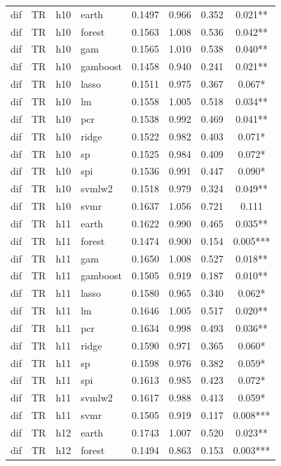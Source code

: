 \begin{ThreePartTable}
\begin{longtable}[t]{llclcccc}
\addlinespace
dif & TR & h10 & earth & 0.1497 & 0.966 & 0.352 & 0.021**\\
dif & TR & h10 & forest & 0.1563 & 1.008 & 0.536 & 0.042**\\
dif & TR & h10 & gam & 0.1565 & 1.010 & 0.538 & 0.040**\\
dif & TR & h10 & gamboost & 0.1458 & 0.940 & 0.241 & 0.021**\\
dif & TR & h10 & lasso & 0.1511 & 0.975 & 0.367 & 0.067*\\
dif & TR & h10 & lm & 0.1558 & 1.005 & 0.518 & 0.034**\\
dif & TR & h10 & pcr & 0.1538 & 0.992 & 0.469 & 0.041**\\
dif & TR & h10 & ridge & 0.1522 & 0.982 & 0.403 & 0.071*\\
dif & TR & h10 & sp & 0.1525 & 0.984 & 0.409 & 0.072*\\
dif & TR & h10 & spi & 0.1536 & 0.991 & 0.447 & 0.090*\\
dif & TR & h10 & svmlw2 & 0.1518 & 0.979 & 0.324 & 0.049**\\
dif & TR & h10 & svmr & 0.1637 & 1.056 & 0.721 & 0.111\\
\addlinespace
dif & TR & h11 & earth & 0.1622 & 0.990 & 0.465 & 0.035**\\
dif & TR & h11 & forest & 0.1474 & 0.900 & 0.154 & 0.005***\\
dif & TR & h11 & gam & 0.1650 & 1.008 & 0.527 & 0.018**\\
dif & TR & h11 & gamboost & 0.1505 & 0.919 & 0.187 & 0.010**\\
dif & TR & h11 & lasso & 0.1580 & 0.965 & 0.340 & 0.062*\\
dif & TR & h11 & lm & 0.1646 & 1.005 & 0.517 & 0.020**\\
dif & TR & h11 & pcr & 0.1634 & 0.998 & 0.493 & 0.036**\\
dif & TR & h11 & ridge & 0.1590 & 0.971 & 0.365 & 0.060*\\
dif & TR & h11 & sp & 0.1598 & 0.976 & 0.382 & 0.059*\\
dif & TR & h11 & spi & 0.1613 & 0.985 & 0.423 & 0.072*\\
dif & TR & h11 & svmlw2 & 0.1617 & 0.988 & 0.413 & 0.059*\\
dif & TR & h11 & svmr & 0.1505 & 0.919 & 0.117 & 0.008***\\
\addlinespace
dif & TR & h12 & earth & 0.1743 & 1.007 & 0.520 & 0.023**\\
dif & TR & h12 & forest & 0.1494 & 0.863 & 0.153 & 0.003***\\

\end{longtable}
\end{ThreePartTable}
